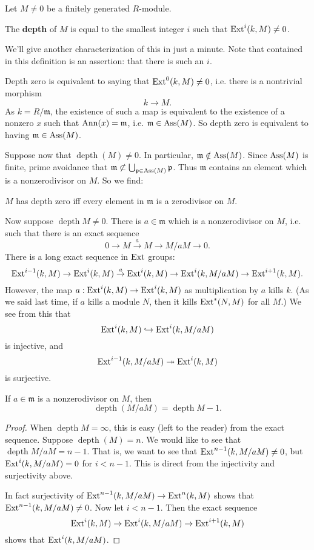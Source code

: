 Let $M \neq 0$ be a finitely generated $R$-module.

\newcommand{\depth}{\operatorname{depth}}
\begin{definition}
The \textbf{depth} of $M$ is equal to the smallest integer $i$
such that
$\operatorname{Ext}^i(k,M) \neq 0$.
\end{definition}

We'll give another characterization of this in just a minute.
Note that
contained in this definition is an assertion: that there is such
an $i$.

\begin{example}
Depth zero is equivalent to saying that $\operatorname{Ext}^0(k,M) \neq 0$,
i.e. there is a
nontrivial morphism
\[ k \to M.  \]
As $k = R/\mathfrak{m}$, the existence of such a map is
equivalent to the existence of a nonzero $x$
such that $\operatorname{Ann}(x) = \mathfrak{m}$, i.e. $\mathfrak{m} \in
\operatorname{Ass}(M)$. So depth
zero is equivalent to having $\mathfrak{m} \in \operatorname{Ass}(M)$.
\end{example}

Suppose now that $\depth(M) \neq 0$. In particular,
$\mathfrak{m} \notin
\operatorname{Ass}(M)$. Since $\operatorname{Ass}(M)$ is finite, prime avoidance that
$\mathfrak{m}
\not\subset \bigcup_{\mathfrak{p} \in \operatorname{Ass}(M)} \mathfrak{p}$.
Thus
$\mathfrak{m}$ contains an element which is a nonzerodivisor on
$M$. So we find:

\begin{proposition}
$M$ has depth zero iff every element in $\mathfrak{m}$ is a
zerodivisor on $M$.
\end{proposition}

Now suppose $\depth M \neq 0$. There is $a \in \mathfrak{m}$
which is a
nonzerodivisor on $M$, i.e.  such that there is
an exact sequence
\[ 0 \to M \stackrel{a}{\to} M \to M/aM \to 0.  \]
There is a long exact sequence in $\operatorname{Ext}$ groups:
\[\operatorname{Ext}^{i-1}(k,M) \to \operatorname{Ext}^i(k,M) \stackrel{a}{\to} \operatorname{Ext}^i(k,M)
\to \operatorname{Ext}^i(k,
M/aM) \to \operatorname{Ext}^{i+1}(k,M)  .\]
However, the map $a: \operatorname{Ext}^i(k,M) \to \operatorname{Ext}^i(k,M)$ as
multiplication by $a$
kills $k$. (As we said last time, if $a$ kills a module $N$,
then it kills
$\operatorname{Ext}^*(N,M)$ for all $M$.) We see from this that
\[ \operatorname{Ext}^i(k,M) \hookrightarrow \operatorname{Ext}^i(k,M/aM)  \]
is injective, and
\[ \operatorname{Ext}^{i-1}(k, M/aM) \twoheadrightarrow \operatorname{Ext}^i(k,M)  \]
is surjective.

\begin{corollary}
If $a \in \mathfrak{m}$ is a nonzerodivisor on $M$, then
\[ \depth(M/aM) = \depth M -1.  \]
\end{corollary}
\begin{proof}
When $\depth M = \infty$, this is easy (left to the reader) from
the exact
sequence. Suppose $\depth(M) = n$. We would like to see that
$\depth M/aM =
n-1$. That is, we want to see that $\operatorname{Ext}^{n-1}(k,M/aM) \neq 0$,
but
$\operatorname{Ext}^i(k,M/aM) =
0$ for $i < n-1$. This is direct from the injectivity and
surjectivity above.

In fact surjectivity of $\operatorname{Ext}^{n-1}(k,M/aM) \to \operatorname{Ext}^n(k,M)$
shows that
$\operatorname{Ext}^{n-1}(k,M/aM) \neq 0$. Now let $i < n-1$. Then the exact
sequence
\[ \operatorname{Ext}^i(k,M) \to \operatorname{Ext}^i(k,M/aM) \to \operatorname{Ext}^{i+1}(k,M)  \]
shows that $\operatorname{Ext}^i(k, M/aM)$.
\end{proof}

